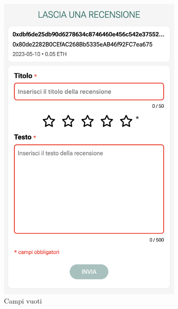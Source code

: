 \begin{figure}[H]
    \centering
    \begin{subfigure}[t]{0.49\textwidth}
    \centering
    \includegraphics[width=0.7\linewidth]{src/img/rilascio_recensione.png}
    \caption{Campi vuoti}\label{fig:rilascio_recensione_vuoto}
    \end{subfigure}
    \centering
    \begin{subfigure}[t]{0.49\textwidth}
    \centering

\end{subfigure}
\end{figure}
